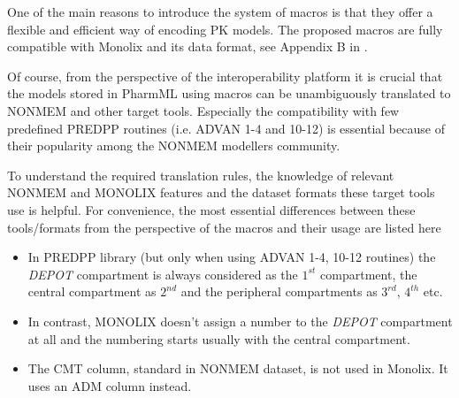One of the main reasons to introduce the system of macros is that they offer a flexible 
and efficient way of encoding PK models. The proposed macros are fully compatible with 
Monolix and its data format, see Appendix B in \cite{Monolix4.3.2UserGuide:2014}. 

Of course, from the perspective of the interoperability platform \marginpar{\HandCuffLeft}
it is crucial that the models stored in PharmML using macros can be unambiguously translated 
to NONMEM and other target tools. Especially the compatibility with few predefined PREDPP 
routines (i.e. ADVAN 1-4 and 10-12) is essential because of their popularity among the 
NONMEM modellers community. 

To understand the required translation rules, the knowledge of relevant NONMEM and 
MONOLIX features and the dataset formats these target tools use is helpful. 
For convenience, the most essential differences between these tools/formats from the 
perspective of the macros and their usage are listed here
\begin{itemize}
\item
In PREDPP library (but only when using ADVAN 1-4, 10-12 routines) the \emph{DEPOT} 
compartment is always considered as the $1^{st}$ compartment, the central compartment 
as $2^{nd}$ and the peripheral compartments as $3^{rd}$, $4^{th}$ etc. 
\item
In contrast, MONOLIX doesn't assign a number to the \emph{DEPOT} 
compartment at all and the numbering starts usually with the central compartment. 
\item
The CMT column, standard in NONMEM dataset, is not used in Monolix. It uses an ADM 
column instead.
\end{itemize}



